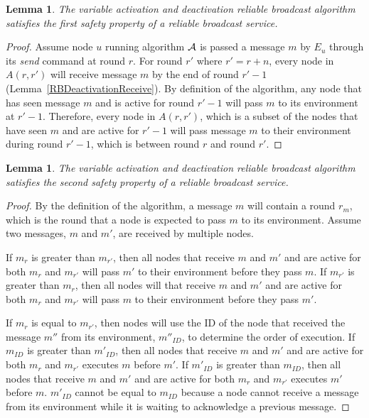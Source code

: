\documentclass[english]{article}
\newtheorem{lemma}[theorem]{Lemma}
\begin{document}
\begin{lemma}
\label{DeactivationRBSafety1}
The variable activation and deactivation reliable broadcast algorithm satisfies the first safety property of a reliable broadcast service.
\end{lemma}
\begin{proof}

Assume node $u$ running algorithm $\cal A$ is passed a message $m$ by $E_u$ through its \textit{send} command at round $r$. For round $r'$ where $r' = r + n$, every node in $A(r,r')$ will receive message $m$ by the end of round $r'-1$ (Lemma~\ref{RBDeactivationReceive}). By definition of the algorithm, any node that has seen message $m$ and is active for round $r'-1$ will pass $m$ to its environment at $r'-1$. Therefore, every node in $A(r,r')$, which is a subset of the nodes that have seen $m$ and are active for $r'-1$ will pass message $m$ to their environment during round $r'-1$, which is between round $r$ and round $r'$.

\end{proof}


\begin{lemma}
\label{DeactivationRBSafety2}
The variable activation and deactivation reliable broadcast algorithm satisfies the second safety property of a reliable broadcast service.
\end{lemma}
\begin{proof}

By the definition of the algorithm, a message $m$ will contain a round $r_m$, which is the round that a node is expected to pass $m$ to its environment. Assume two messages, $m$ and $m'$, are received by multiple nodes.

If $m_r$ is greater than $m_{r'}$, then all nodes that receive $m$ and $m'$ and are active for both $m_r$ and $m_{r'}$ will pass $m'$ to their environment before they pass $m$. If $m_{r'}$ is greater than $m_r$, then all nodes will that receive $m$ and $m'$ and are active for both $m_r$ and $m_{r'}$ will pass $m$ to their environment before they pass $m'$.

If $m_r$ is equal to $m_{r'}$, then nodes will use the ID of the node that received the message $m''$ from its environment, $m''_{ID}$, to determine the order of execution. If $m_{ID}$ is greater than $m'_{ID}$, then all nodes that receive $m$ and $m'$ and are active for both $m_r$ and $m_{r'}$ executes $m$ before $m'$. If $m'_{ID}$ is greater than $m_{ID}$, then all nodes that receive $m$ and $m'$ and are active for both $m_r$ and $m_{r'}$ executes $m'$ before $m$. $m'_{ID}$ cannot be equal to $m_{ID}$ because a node cannot receive a message from its environment while it is waiting to acknowledge a previous message.



\end{proof}
\end{document}
